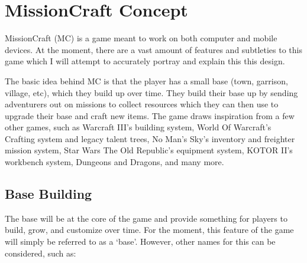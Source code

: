 \chapter{MissionCraft Concept}

MissionCraft (MC) is a game meant to work on both computer and mobile devices. At the moment, there are a vast amount of features and subtleties to this game which I will attempt to accurately portray and explain this this design.

The basic idea behind MC is that the player has a small base (town, garrison, village, etc), which they build up over time. They build their base up by sending adventurers out on missions to collect resources which they can then use to upgrade their base and craft new items. The game draws inspiration from a few other games, such as Warcraft III's building system, World Of Warcraft's Crafting system and legacy talent trees, No Man's Sky's inventory and freighter mission system, Star Wars The Old Republic's equipment system, KOTOR II's workbench system, Dungeons and Dragons, and many more. 










\section{Base Building}

The base will be at the core of the game and provide something for players to build, grow, and customize over time. For the moment, this feature of the game will simply be referred to as a `base'. However, other names for this can be considered, such as:

